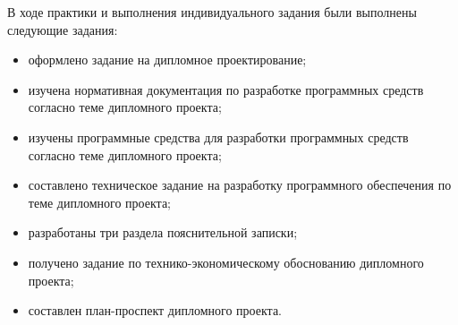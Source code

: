 
В ходе практики и выполнения индивидуального задания были выполнены следующие задания:

\begin{itemize}
\item оформлено задание на дипломное проектирование;
\item изучена нормативная документация по разработке программных средств согласно теме дипломного проекта;
\item изучены программные средства для разработки программных средств согласно теме дипломного проекта;
\item составлено техническое задание на разработку программного обеспечения по теме дипломного проекта;
\item разработаны три раздела пояснительной записки;
\item получено задание по технико-экономическому обоснованию дипломного проекта;
\item составлен план-проспект дипломного проекта.
\end{itemize}